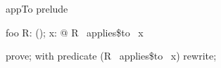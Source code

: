 
\begin{zsection}
 \SECTION appTo \parents prelude
\end{zsection}

\begin{theorem}{foo}
   \forall R: \power(\nat \cross \nat); x: \nat @ R~ applies\$to~ x
\end{theorem}

\begin{zproof}[foo]
   prove;
   with predicate (R~ applies\$to~ x) rewrite;
\end{zproof}